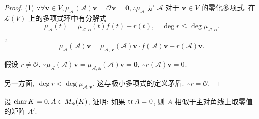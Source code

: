 \documentclass{ctexart}
\begin{document}
\begin{proof}
    (1) $\because\forall\boldsymbol{v}\in V,\mu_{\mathcal{A}}(\mathcal{A})\boldsymbol{v}=\mathcal{O}\boldsymbol{v}=\boldsymbol{0},\therefore\mu_{\mathcal{A}}$ 是 $\mathcal{A}$ 对于 $\boldsymbol{v}\in V$ 的零化多项式. 在 $\mathcal{L}(V)$ 上的多项式环中有分解式
    \[\mu_{\mathcal{A}}(t)=\mu_{\mathcal{A},\boldsymbol{a}}(t)f(t)+r(t),\quad\deg r\leq\deg\mu_{\mathcal{A},\boldsymbol{a}}.\]

    $\therefore$
    \[\mu_{\mathcal{A}}(\mathcal{A})\boldsymbol{v}=\mu_{\mathcal{A},\boldsymbol{v}}(\mathcal{A})\boldsymbol{v}\cdot f(\mathcal{A})\boldsymbol{v}+r(\mathcal{A})\boldsymbol{v}.\]

    假设 $r\neq\mathcal{O}$. $\because\mu_{\mathcal{A}}(\mathcal{A})\boldsymbol{v}=\mu_{\mathcal{A},\boldsymbol{a}}(\mathcal{A})\boldsymbol{v}=\boldsymbol{0}$, $\therefore r(\mathcal{A})\boldsymbol{v}=0$.
    
    另一方面, $\deg r<\deg\mu_{\mathcal{A},\boldsymbol{v}}$, 这与极小多项式的定义矛盾. $\therefore r=\mathcal{O}$.
\end{proof}
\begin{exercise}\label{ex2.11}
    设 $\operatorname{char} K=0,A\in M_n(K)$, 证明: 如果 $\operatorname{tr} A=0$, 则 $A$ 相似于主对角线上取零值的矩阵 $A'$.
\end{exercise}
\end{document}
